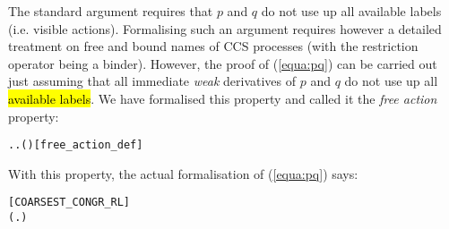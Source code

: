 The standard argument \cite{Mil89} requires that $p$
and $q$ do not use up all available labels (i.e. visible actions).
Formalising such an argument requires however 
a detailed
treatment on free and bound names of CCS
processes (with the restriction operator being a binder).
However, the proof of (\ref{equa:pq}) can be carried out 
just assuming that all immediate \emph{weak} derivatives of
 $p$ and $q$ do not use up all \hl{available labels}.
We have formalised this property and
 called it the \emph{free action} property:
\begin{alltt}
  \HOLSymConst{\HOLTokenEquiv{}} \HOLSymConst{\HOLTokenExists{}}. \HOLSymConst{\HOLTokenForall{}}. \HOLSymConst{\HOLTokenNeg{}}( \HOLTokenWeakTransBegin{} \HOLTokenWeakTransEnd {})\hfill{[free_action_def]}
\end{alltt}

With this property, the actual formalisation of (\ref{equa:pq}) says:
\vspace{-2ex}
\begin{alltt}
\hfill{[COARSEST_CONGR_RL]}
\HOLTokenTurnstile{}   \HOLSymConst{\HOLTokenConj{}}   \HOLSymConst{\HOLTokenImp{}} (\HOLSymConst{\HOLTokenForall{}}.  \HOLSymConst{+}  \HOLSymConst{\HOLTokenWeakEQ}  \HOLSymConst{+} ) \HOLSymConst{\HOLTokenImp{}}  \HOLSymConst{\HOLTokenObsCongr} 
\end{alltt}

